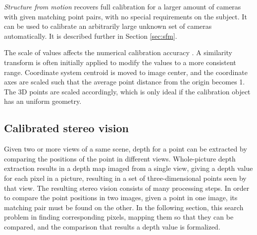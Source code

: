 \emph{Structure from motion} recovers full calibration for a larger amount of cameras with given matching point pairs, with no special requirements on the subject.
It can be used to calibrate an arbitrarily large unknown set of cameras automatically.
It is described further in Section \ref{sec:sfm}.





The scale of values affects the numerical calibration accuracy \cite{hartley1997defense,hartley03multiview}.
A similarity transform is often initially applied to modify the values to a more consistent range.
Coordinate system centroid is moved to image center, and the coordinate axes are scaled such that the average point distance from the origin becomes 1.
The 3D points are scaled accordingly, which is only ideal if the calibration object has an uniform geometry. \cite{hartley03multiview}


\subsection{Calibrated stereo vision} %

Given two or more views of a same scene, depth for a point can be extracted by comparing the positions of the point in different views.
Whole-picture depth extraction results in a depth map imaged from a single view, giving a depth value for each pixel in a picture, resulting in a set of three-dimensional points seen by that view.
The resulting stereo vision consists of many processing steps.
In order to compare the point positions in two images, given a point in one image, its matching pair must be found on the other.
In the following section, this search problem in finding corresponding pixels, mapping them so that they can be compared, and the comparison that results a depth value is formalized.


